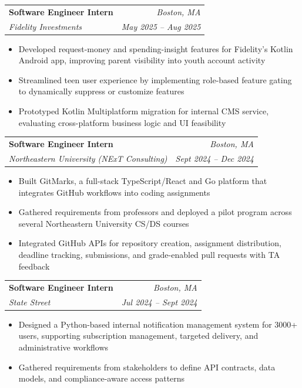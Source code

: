 \documentclass[letterpaper,11pt]{article}
\makeatletter
\newcommand{\resumeItem}[1]{
  \item\small{
    {#1 \vspace{-2.5pt}}
  }
}
\newcommand{\resumeSubheading}[4]{
  \vspace{-3pt}\item
    \begin{tabular*}{0.97\textwidth}[t]{l@{\extracolsep{\fill}}r}
    \vspace{-2pt}
      \textbf{#1} & \textit{#2} \\
      \textit{\small#3} & \textit{\small #4} \\
    \end{tabular*}\vspace{-7pt}
}
\newcommand{\resumeItemListStart}{\begin{itemize}}
\newcommand{\resumeItemListEnd}{\end{itemize}\vspace{-5pt}}
\makeatother
\begin{document}
  \resumeSubheading
      {Software Engineer Intern}{Boston, MA}
      {Fidelity Investments}{May 2025 -- Aug 2025}
      \resumeItemListStart
            \resumeItem{Developed request-money and spending-insight features for Fidelity’s Kotlin Android app, improving parent visibility into youth account activity}
            \resumeItem{Streamlined teen user experience by implementing role-based feature gating to dynamically suppress or customize features}
            \resumeItem{Prototyped Kotlin Multiplatform migration for internal CMS service, evaluating cross-platform business logic and  UI feasibility}
        \resumeItemListEnd
    \vspace{4pt}

    \resumeSubheading
        {Software Engineer Intern}{Boston, MA}
        {Northeastern University (NExT Consulting)}{Sept 2024 -- Dec 2024}
        \resumeItemListStart
            \resumeItem{Built GitMarks, a full-stack TypeScript/React and Go platform that integrates GitHub workflows into coding assignments}
            \resumeItem{Gathered requirements from professors and deployed a pilot program across several Northeastern University CS/DS courses}
            \resumeItem{Integrated GitHub APIs for repository creation, assignment distribution, deadline tracking, submissions, and grade-enabled pull requests with TA feedback}
        \resumeItemListEnd
    \vspace{1pt}

    \resumeSubheading
      {Software Engineer Intern}{Boston, MA}
      {State Street}{Jul 2024 -- Sept 2024}
      \resumeItemListStart
        \resumeItem{Designed a Python-based internal notification management system for 3000+ users, supporting subscription management, targeted delivery, and administrative workflows}
        \resumeItem{Gathered requirements from stakeholders to define API contracts, data models, and compliance-aware access patterns}
      \resumeItemListEnd
    \vspace{1pt}
    
\end{document}
